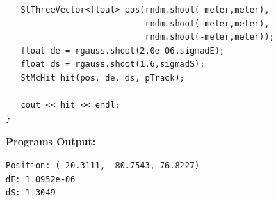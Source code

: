 \begin{Entry}
{\begin{verbatim}
   StThreeVector<float> pos(rndm.shoot(-meter,meter),
                            rndm.shoot(-meter,meter),
                            rndm.shoot(-meter,meter));
   float de = rgauss.shoot(2.0e-06,sigmadE);
   float ds = rgauss.shoot(1.6,sigmadS);
   StMcHit hit(pos, de, ds, pTrack);

   cout << hit << endl;
}
\end{verbatim}
}%
{\bf Programs Output:}
{\footnotesize
\begin{verbatim}
Position: (-20.3111, -80.7543, 76.8227)
dE: 1.0952e-06
dS: 1.3049
\end{verbatim}
}%

\end{Entry}

%
%
